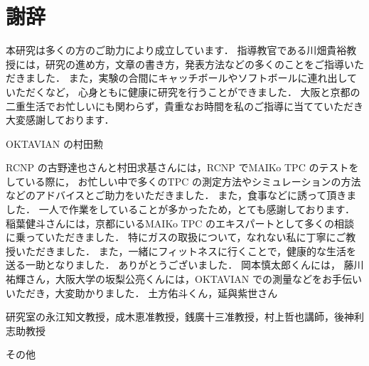 \documentclass[../master]{subfiles}
\begin{document}
\chapter*{謝辞}
本研究は多くの方のご助力により成立しています．
指導教官である川畑貴裕教授には，研究の進め方，文章の書き方，発表方法などの多くのことをご指導いただきました．
また，実験の合間にキャッチボールやソフトボールに連れ出していただくなど，
心身ともに健康に研究を行うことができました．
大阪と京都の二重生活でお忙しいにも関わらず，貴重なお時間を私のご指導に当てていただき大変感謝しております．

OKTAVIAN の村田勲

RCNP の古野達也さんと村田求基さんには，RCNP でMAIKo TPC のテストをしている際に，
お忙しい中で多くのTPC の測定方法やシミュレーションの方法などのアドバイスとご助力をいただきました．
また，食事などに誘って頂きました．
一人で作業をしていることが多かったため，とても感謝しております．
稲葉健斗さんには，京都にいるMAIKo TPC のエキスパートとして多くの相談に乗っていただきました．
特にガスの取扱について，なれない私に丁寧にご教授いただきました．
また，一緒にフィットネスに行くことで，健康的な生活を送る一助となりました．
ありがとうございました．
岡本慎太郎くんには，
藤川祐輝さん，大阪大学の坂梨公亮くんには，OKTAVIAN での測量などをお手伝いいただき，大変助かりました．
土方佑斗くん，延與紫世さん

研究室の永江知文教授，成木恵准教授，銭廣十三准教授，村上哲也講師，後神利志助教授

その他
\end{document}
